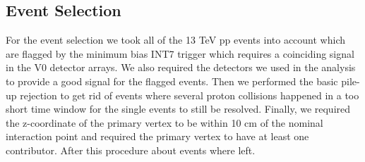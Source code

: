 \subsection{Event Selection}
For the event selection we took all of the  13 TeV pp events into account which are flagged by the minimum bias INT7 trigger which requires a coinciding signal in the V0 detector arrays. We also required the detectors we used in the analysis to provide a good signal for the flagged events. Then we performed the basic pile-up rejection to get rid of events where several proton collisions happened in a too short time window for the single events to still be resolved. Finally, we required the z-coordinate of the primary vertex to be within 10 cm of the nominal interaction point and required the primary vertex to have at least one contributor. After this procedure about events where left. \\


